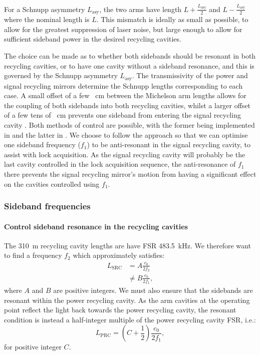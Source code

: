 For a Schnupp asymmetry $L_{\text{asy}}$, the two arms have length $L + \frac{L_{\text{asy}}}{2}$ and $L - \frac{L_{\text{asy}}}{2}$ where the nominal length is $L$. This mismatch is ideally as small as possible, to allow for the greatest suppression of laser noise, but large enough to allow for sufficient sideband power in the desired recycling cavities.

The choice can be made as to whether both sidebands should be resonant in both recycling cavities, or to have one cavity without a sideband resonance, and this is governed by the Schnupp asymmetry $L_{\text{asy}}$. The transmissivity of the power and signal recycling mirrors determine the Schnupp lengths corresponding to each case. A small offset of a few \SI{}{\centi\meter} between the Michelson arm lengths allows for the coupling of both sidebands into both recycling cavities, whilst a larger offset of a few tens of \SI{}{\centi\meter} prevents one sideband from entering the signal recycling cavity \cite{Vajente2008}. Both methods of control are possible, with the former being implemented in \KAGRA{}  and the latter in \ALIGO{} \cite{Abbott2010}. We choose to follow the \ALIGO{} approach so that we can optimise one sideband frequency ($f_1$) to be anti-resonant in the signal recycling cavity, to assist with lock acquisition. As the signal recycling cavity will probably be the last cavity controlled in the lock acquisition sequence, the anti-resonance of $f_1$ there prevents the signal recycling mirror's motion from having a significant effect on the cavities controlled using $f_1$.

\subsubsection{Sideband frequencies}

\paragraph{Control sideband resonance in the recycling cavities}
The \SI{310}{\meter} recycling cavity lengths are have \gls{FSR} \SI{483.5}{\kilo\hertz}. We therefore want to find a frequency $f_2$ which approximately satisfies:
\begin{equation}
  \label{eq:src-fsr}
  \begin{split}
    L_{\text{SRC}} &= A \frac{c_0}{2 f_2} \\
                   &\neq B \frac{c_0}{2 f_1},
  \end{split}
\end{equation}
where $A$ and $B$ are positive integers. We must also ensure that the sidebands are resonant within the power recycling cavity. As the arm cavities at the operating point reflect the light back towards the power recycling cavity, the resonant condition is instead a half-integer multiple of the power recycling cavity \gls{FSR}, i.e.:
\begin{equation}
  \label{eq:prc-fsr}
  L_{\text{PRC}} = \left(C + \frac{1}{2} \right) \frac{c_0}{2 f_1},
\end{equation}
for positive integer $C$.

